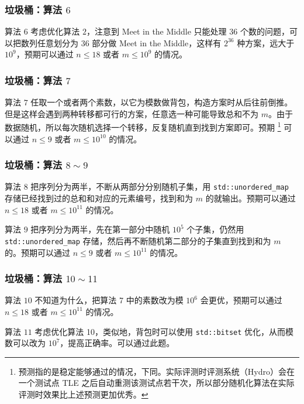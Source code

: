 \documentclass{beamer}
\begin{document}
\begin{frame}
\frametitle{垃圾桶：算法 $6$}
\begin{block}{算法 $6$}
考虑优化算法 $2$，注意到 Meet in the Middle 只能处理 $36$ 个数的问题，可以把数列任意划分为 $36$ 部分做 Meet in the Middle，这样有 $2^{36}$ 种方案，远大于 $10^9$，预期可以通过 $n \leq 18$ 或者 $m \leq 10^9$ 的情况。
\end{block}
\end{frame}

\begin{frame}
\frametitle{垃圾桶：算法 $7$}
\begin{block}{算法 $7$}
任取一个或者两个素数，以它为模数做背包，构造方案时从后往前倒推。但是这样会遇到两种转移都可行的方案，任意选一种可能导致总和不为 $m$。由于数据随机，所以每次随机选择一个转移，反复随机直到找到方案即可。预期 \footnote{预测指的是稳定能够通过的情况，下同。实际评测时评测系统（Hydro）会在一个测试点 TLE 之后自动重测该测试点若干次，所以部分随机化算法在实际评测时效果比上述预测更加优秀。} 可以通过 $n \leq 9$ 或者 $m \leq 10^{10}$ 的情况。
\end{block}
\end{frame}

\begin{frame}
\frametitle{垃圾桶：算法 $8 \sim 9$}
\begin{block}{算法 $8$}
把序列分为两半，不断从两部分分别随机子集，用 \texttt{std::unordered\_map} 存储已经找到过的总和和对应的元素编号，找到和为 $m$ 的就输出。预期可以通过 $n \leq 18$ 或者 $m \leq 10^{11}$ 的情况。
\end{block}
\pause
\begin{block}{算法 $9$}
把序列分为两半，先在第一部分中随机 $10^5$ 个子集，仍然用 \texttt{std::unordered\_map} 存储，然后再不断随机第二部分的子集直到找到和为 $m$ 的。预期可以通过 $n \leq 9$ 或者 $m \leq 10^{11}$ 的情况。
\end{block}
\end{frame}

\begin{frame}
\frametitle{垃圾桶：算法 $10 \sim 11$}
\begin{block}{算法 $10$}
不知道为什么，把算法 7 中的素数改为模 $10^6$ 会更优，预期可以通过 $n \leq 18$ 或者 $m \leq 10^{11}$ 的情况。
\end{block}
\pause
\begin{block}{算法 $11$}
考虑优化算法 10，类似地，背包时可以使用 \texttt{std::bitset} 优化，从而模数可以改为 $10^7$，提高正确率。可以通过此题。
\end{block}
\end{frame}
\end{document}
